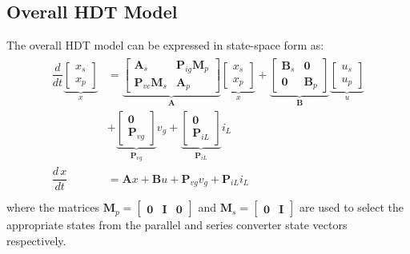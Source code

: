 \subsection{Overall HDT Model}
The overall HDT model can be expressed in state-space form as:
\begin{align}
    \begin{aligned}
        \dfrac{d}{dt}
        \underbrace{
        \begin{bmatrix}
            x_s\\
            x_p
        \end{bmatrix}
        }_{x}
        &=
        \underbrace{
        \begin{bmatrix}
            \mathbf{A}_s & \mathbf{P}_{ig}\mathbf{M}_p \\
            \mathbf{P}_{vc}\mathbf{M}_s & \mathbf{A}_p
        \end{bmatrix}
        }_{\mathbf{A}}
        \underbrace{
        \begin{bmatrix}
            x_s\\
            x_p
        \end{bmatrix}
        }_{x}
        +
        \underbrace{
        \begin{bmatrix}
            \mathbf{B}_s & \mathbf{0} \\
            \mathbf{0} & \mathbf{B}_p
        \end{bmatrix}
        }_{\mathbf{B}}
        \underbrace{
        \begin{bmatrix}
            u_s\\
            u_p 
        \end{bmatrix}
        }_{u}
        \\
        &+
        \underbrace{
        \begin{bmatrix}
            \mathbf{0}\\
            \mathbf{P}_{vg}
        \end{bmatrix}
        }_{\mathbf{P}_{vg}}
        v_g
        +
        \underbrace{
        \begin{bmatrix}
            \mathbf{0}\\
            \mathbf{P}_{iL}
        \end{bmatrix}
        }_{\mathbf{P}_{iL}}
        i_L\\
        \dfrac{d\,x}{dt} &= \mathbf{A}x + \mathbf{B}u + \mathbf{P}_{vg}v_g + \mathbf{P}_{iL}i_L \label{eq:HDT_State_Space}\\
    \end{aligned}
\end{align}
where the matrices $\mathbf{M}_p = \begin{bmatrix}\mathbf{0} & \mathbf{I} & \mathbf{0}\end{bmatrix}$ and $\mathbf{M}_s = \begin{bmatrix}\mathbf{0} & \mathbf{I}\end{bmatrix}$ are used to select the appropriate states from the parallel and series converter state vectors respectively.

